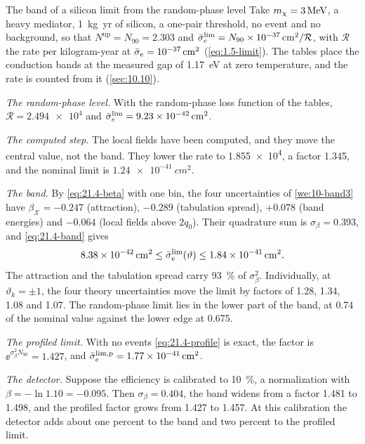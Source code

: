 \begin{workedexample}{The band of a silicon limit from the random-phase level}\label{we:21-rpaband}
Take $m_{\chi} = \SI{3}{MeV}$, a heavy mediator, \SI{1}{kg.yr} of silicon, a one-pair threshold, no event and no background, so that $N^{\mathrm{up}} = N_{90} = 2.303$ and $\bar{\sigma}_{e}^{\mathrm{lim}} = N_{90}\times\SI{e-37}{cm^2}/\mathcal{R}$, with $\mathcal{R}$ the rate per kilogram-year at $\bar{\sigma}_{e} = \SI{e-37}{cm^2}$ (\cref{eq:1.5-limit}). The tables place the conduction bands at the measured gap of \SI{1.17}{eV} at zero temperature, and the rate is counted from it (\cref{sec:10.10}).

\emph{The random-phase level.} With the random-phase loss function of the tables, $\mathcal{R} = \num{2.494e4}$ and $\bar{\sigma}_{e}^{\mathrm{lim}} = \SI{9.23e-42}{cm^2}$.

\emph{The computed step.} The local fields have been computed, and they move the central value, not the band. They lower the rate to \num{1.855e4}, a factor 1.345, and the nominal limit is $\SI{1.24e-41}{cm^2}$.

\emph{The band.} By \cref{eq:21.4-beta} with one bin, the four uncertainties of \cref{we:10-band3} have $\beta_{\mathcal{X}} = -0.247$ (attraction), $-0.289$ (tabulation spread), $+0.078$ (band energies) and $-0.064$ (local fields above $2q_0$). Their quadrature sum is $\sigma_\beta = 0.393$, and \cref{eq:21.4-band} gives
\begin{equation*}
  \SI{8.38e-42}{cm^2} \le \bar{\sigma}_{e}^{\mathrm{lim}}(\vartheta) \le \SI{1.84e-41}{cm^2} .
\end{equation*}
The attraction and the tabulation spread carry \SI{93}{\percent} of $\sigma_\beta^2$. Individually, at $\vartheta_k = \pm1$, the four theory uncertainties move the limit by factors of 1.28, 1.34, 1.08 and 1.07. The random-phase limit lies in the lower part of the band, at 0.74 of the nominal value against the lower edge at 0.675.

\emph{The profiled limit.} With no events \cref{eq:21.4-profile} is exact, the factor is $\ee^{\sigma_\beta^2N_{90}} = 1.427$, and $\bar{\sigma}_{e}^{\mathrm{lim,p}} = \SI{1.77e-41}{cm^2}$.

\emph{The detector.} Suppose the efficiency is calibrated to \SI{10}{\percent}, a normalization with $\beta = -\ln 1.10 = -0.095$. Then $\sigma_\beta = 0.404$, the band widens from a factor 1.481 to 1.498, and the profiled factor grows from 1.427 to 1.457. At this calibration the detector adds about one percent to the band and two percent to the profiled limit.
\end{workedexample}

